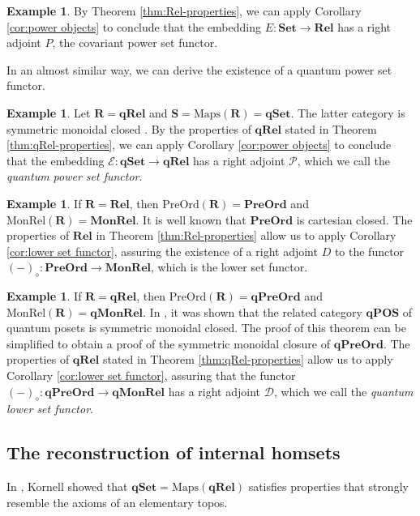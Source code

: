 \documentclass[12pt]{tac}
\theoremstyle{definition}
\newtheorem{example}[theorem]{Example}
\theoremstyle{remark}
\newcommand{\D}{\mathcal D}
\newcommand{\E}{\mathcal E}
\renewcommand{\P}{\mathcal P}
\newcommand{\<}{\langle}
\renewcommand{\>}{\rangle}
\renewcommand{\:}{\colon}
\newcommand{\qRel}{\mathbf{qRel}}
\begin{document}
\begin{example}\label{ex:power set}
By Theorem \ref{thm:Rel-properties},  we can apply Corollary \ref{cor:power objects} to conclude that the embedding $E:\mathbf{Set}\to\mathbf{Rel}$ has a right adjoint $P$, the covariant power set functor. 
\end{example}
In an almost similar way, we can derive the existence of a quantum power set functor. 
\begin{example}\label{ex:quantum power set}
Let $\mathbf{R}=\mathbf{qRel}$ and $\mathbf S=\mathrm{Maps}(\mathbf R)=\mathbf{qSet}$. The latter category is symmetric monoidal closed \cite[Theorem 9.1]{Kornell18}. By the properties of $\qRel$ stated in Theorem \ref{thm:qRel-properties}, we can apply Corollary \ref{cor:power objects} to conclude that the embedding $\E:\mathbf{qSet}\to\mathbf{qRel}$ has a right adjoint $\P$, which we call the \emph{quantum power set functor}.
\end{example}

\begin{example}
If $\mathbf R=\mathbf{Rel}$, then $\mathrm{PreOrd}(\mathbf R)=\mathbf{PreOrd}$ and $\mathrm{MonRel}(\mathbf R)=\mathbf{MonRel}$. It is well known that $\mathbf{PreOrd}$ is cartesian closed. The properties of $\mathbf{Rel}$ in Theorem \ref{thm:Rel-properties} allow us to apply Corollary \ref{cor:lower set functor}, assuring the existence of a right adjoint $D$ to the functor $(-)_\diamond:\mathbf{PreOrd}\to\mathbf{MonRel}$, which is the lower set functor.
\end{example}


\begin{example}
If $\mathbf R=\mathbf{qRel}$, then $\mathrm{PreOrd}(\mathbf R)=\mathbf{qPreOrd}$ and $\mathrm{MonRel}(\mathbf R)=\mathbf{qMonRel}$. In \cite[Theorem 8.3]{klm-quantumposets}, it was shown that the related category $\mathbf{qPOS}$ of quantum posets is symmetric monoidal closed. The proof of this theorem can be simplified to obtain a proof of the symmetric monoidal closure of $\mathbf{qPreOrd}$. The properties of $\mathbf{qRel}$ stated in Theorem \ref{thm:qRel-properties} allow us to apply Corollary \ref{cor:lower set functor}, assuring that the functor $(-)_\diamond:\mathbf{qPreOrd}\to\mathbf{qMonRel}$ has a right adjoint $\D$, which we call the \emph{quantum lower set functor}. 
\end{example}



\subsection{The reconstruction of internal homsets}
In \cite{Kornell18}, Kornell showed that $\mathbf{qSet}=\mathrm{Maps}(\mathbf{qRel})$ satisfies properties that strongly resemble the axioms of an elementary topos. 
\end{document}
